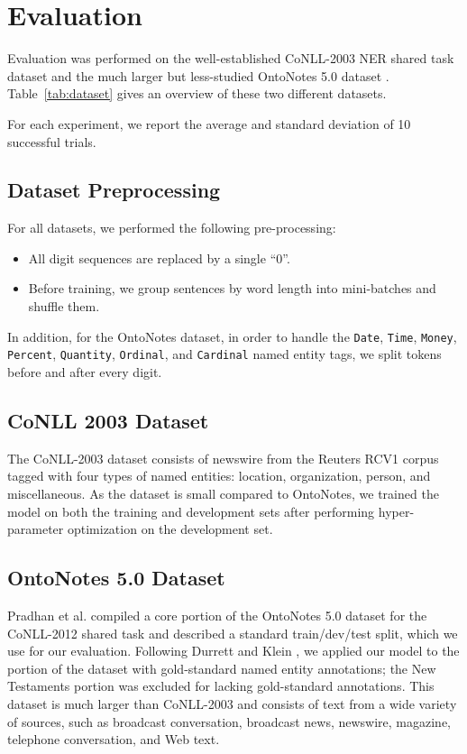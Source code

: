 \documentclass[11pt,letterpaper]{article}
\begin{document}
\section{Evaluation}

Evaluation was performed on the well-established CoNLL-2003 NER shared task dataset \cite{conll2003} and the much larger but less-studied OntoNotes 5.0 dataset \cite{ontonotes2006,pradhan2013}. Table~\ref{tab:dataset} gives an overview of these two different datasets.

For each experiment, we report the average and standard deviation of 10 successful trials.

\subsection{Dataset Preprocessing}

For all datasets, we performed the following pre-processing:
\begin{itemize}
\item All digit sequences are replaced by a single ``0''.
\item Before training, we group sentences by word length
into mini-batches and shuffle them.
\end{itemize}
In addition, for the OntoNotes dataset, in order to handle the {\tt Date}, {\tt Time}, {\tt Money}, {\tt Percent}, {\tt Quantity}, {\tt Ordinal}, and {\tt Cardinal} named entity tags, we split tokens before and after every digit.

\subsection{CoNLL 2003 Dataset}

The CoNLL-2003 dataset \cite{conll2003} consists of newswire from the Reuters RCV1 corpus tagged with four types of named entities: location, organization, person, and miscellaneous. As the dataset is small compared to OntoNotes, we trained the model on both the training and development sets after performing hyper-parameter optimization on the development set.




\subsection{OntoNotes 5.0 Dataset}

Pradhan et al.  compiled a core portion of the OntoNotes 5.0 dataset for the CoNLL-2012 shared task and described a standard train/dev/test split, which we use for our evaluation. Following Durrett and Klein , we applied our model to the portion of the dataset with gold-standard named entity annotations; the New Testaments portion was excluded for lacking gold-standard annotations. This dataset is much larger than CoNLL-2003 and consists of text from a wide variety of sources, such as broadcast conversation, broadcast news, newswire, magazine, telephone conversation, and Web text.
\end{document}
